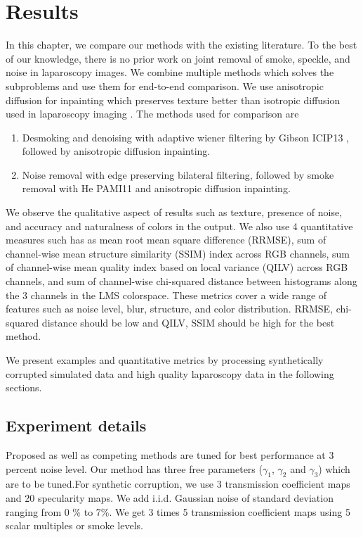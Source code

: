 \chapter{Results}

In this chapter, we compare our methods with the existing literature. To the best of our knowledge, there is no prior work on joint removal of smoke, speckle, and noise in laparoscopy images. We combine multiple methods which solves the subproblems and use them for end-to-end comparison. We use anisotropic diffusion for inpainting which preserves texture better than isotropic diffusion used in laparoscopy imaging \cite{saint2011detection, arnold2010speckle}. The methods used for comparison are
\begin{enumerate}
    \item Desmoking and denoising with adaptive wiener filtering by Gibson ICIP13 \cite{gibson2013wiener}, followed by anisotropic diffusion inpainting.
    \item Noise removal with edge preserving bilateral filtering, followed by smoke removal with He PAMI11 \cite{he2011dark} and anisotropic diffusion inpainting.
\end{enumerate}

We observe the qualitative aspect of results such as texture, presence of noise, and accuracy and naturalness of colors in the output. We also use 4 quantitative measures such has as mean root mean square difference (RRMSE), sum of channel-wise mean structure similarity (SSIM) index across RGB channels, sum of channel-wise mean quality index based on local variance (QILV) across RGB channels, and sum of channel-wise chi-squared distance between histograms along the 3 channels in the LMS colorspace. These metrics cover a wide range of features such as noise level, blur, structure, and color distribution. RRMSE, chi-squared distance should be low and QILV, SSIM should be high for the best method.

We present examples and quantitative metrics by processing synthetically corrupted simulated data and high quality laparoscopy data in the following sections.

\section{Experiment details}
Proposed as well as competing methods are tuned for best performance at 3 percent noise level. Our method has three free parameters ($\gamma_1$,  $\gamma_2$ and $\gamma_3$) which are to be tuned.For synthetic corruption, we use 3 transmission coefficient maps and 20 specularity maps. We add i.i.d. Gaussian noise of standard deviation ranging from 0 \% to 7\%. We get 3 times 5 transmission coefficient maps using 5 scalar multiples or smoke levels. 

